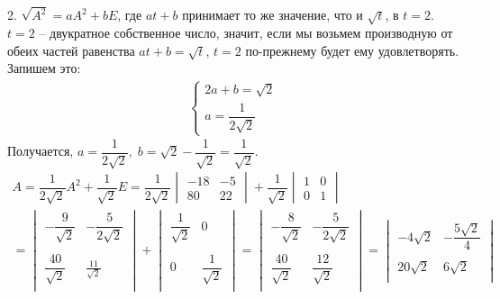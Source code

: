 \begin{enumerate}
				2. $\sqrt{A^{2}} = aA^{2} + bE$, где $at + b$ принимает то же значение, что и $\sqrt{t}$, в $t = 2$. $t = 2$ -- двукратное собственное число, значит, если мы возьмем производную от обеих частей равенства $at + b = \sqrt{t}$, $t = 2$ по-прежнему будет ему удовлетворять. Запишем это: 
				\begin{gather*}
					\begin{cases}
						2a + b = \sqrt{2}\\
						a = \dfrac{1}{2\sqrt{2}}
					\end{cases}
				\end{gather*}
				Получается, $a = \dfrac{1}{2\sqrt{2}}, \; b = \sqrt{2} - \dfrac{1}{\sqrt{2}} = \dfrac{1}{\sqrt{2}}$.
				\begin{gather*}
					A = 
					\dfrac{1}{2\sqrt{2}}A^{2} + \dfrac{1}{\sqrt{2}}E =
					\dfrac{1}{2\sqrt{2}} 
					\begin{vmatrix} 
						-18 & -5\\
						80 & 22
					\end{vmatrix} 
					+ \dfrac{1}{\sqrt{2}}
					\begin{vmatrix}
						1 & 0\\
						0 & 1
					\end{vmatrix}
					\\
					= 
					\begin{vmatrix}
						-\dfrac{9}{\sqrt{2}} & -\dfrac{5}{2\sqrt{2}}\\
						\\
						\dfrac{40}{\sqrt{2}} & \frac{11}{\sqrt{2}}\\
					\end{vmatrix}
					+
					\begin{vmatrix} 
						\dfrac{1}{\sqrt{2}} & 0\\
						\\
						0 & \dfrac{1}{\sqrt{2}}\\
					\end{vmatrix}
					=
					\begin{vmatrix}
						-\dfrac{8}{\sqrt{2}} & -\dfrac{5}{2\sqrt{2}}\\
						\\
						\dfrac{40}{\sqrt{2}} & \dfrac{12}{\sqrt{2}}\\
					\end{vmatrix}
					=
					\begin{vmatrix}
						-4\sqrt{2} & -\dfrac{5 \sqrt{2}}{4}\\
						\\
						20 \sqrt{2} & 6 \sqrt{2}\\
					\end{vmatrix}
				\end{gather*}
		\end{enumerate}
		
